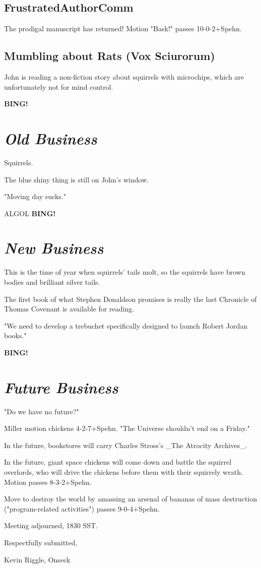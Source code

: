 \documentclass[10pt]{article}
\newcommand{\bing}{{\bf BING!} }
\newcommand{\goto}[1]{\bing \vskip 12pt \section*{{\em{#1}}}}
\begin{document}
\subsection*{FrustratedAuthorComm}
The prodigal manuscript has returned!  Motion "Bask!" passes 10-0-2+Spehn.

\subsection*{Mumbling about Rats (Vox Sciurorum)}
John is reading a non-fiction story about squirrels with microchips, which are unfortunately not for mind control.

\goto{Old Business}
Squirrels.

The blue shiny thing is still on John's window.

"Moving day sucks."

ALGOL
\goto{New Business}
This is the time of year when squirrels' tails molt, so the squirrels have brown bodies and brilliant silver tails.

The first book of what Stephen Donaldson promises is really the last Chronicle of Thomas Covenant is available 
for reading.

"We need to develop a trebuchet specifically designed to launch Robert Jordan books."

\goto{Future Business}
"Do we have no future?"

Miller motion chickens 4-2-7+Spehn.  "The Universe shouldn't end on a Friday."

In the future, bookstores will carry Charles Stross's _The Atrocity Archives_.

In the future, giant space chickens will come down and battle the squirrel overlords, who will drive the chickens 
before them with their squirrely wrath.  Motion passes 8-3-2+Spehn.

Move to destroy the world by amassing an arsenal of bananas of mass destruction ("program-related activities") 
passes 9-0-4+Spehn.

\vspace{12pt}

\noindent
Meeting adjourned, 1830 SST.

\vspace{18pt}

\centerline{Respectfully submitted,}
\centerline{Kevin Riggle, Onseck}
\end{document}
